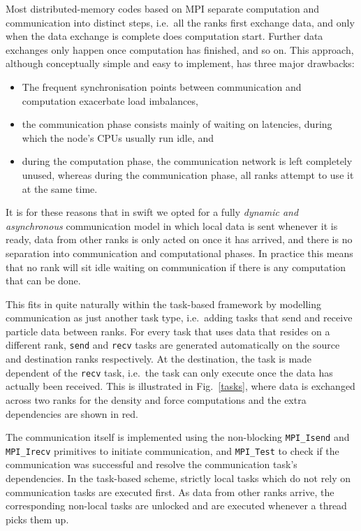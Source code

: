 \documentclass{sig-alternate-05-2015}
\newcommand{\swift}{{\sc swift}\xspace}
\begin{document}
Most distributed-memory codes based on MPI \cite{ref:Snir1998}
separate computation and communication into distinct steps, i.e.~all
the ranks first exchange data, and only when the data exchange is
complete does computation start. Further data exchanges only happen
once computation has finished, and so on.
This approach, although conceptually simple and easy to implement,
has three major drawbacks:
\begin{itemize}
  \item The frequent synchronisation points between communication
    and computation exacerbate load imbalances,
  \item the communication phase consists mainly of waiting on
    latencies, during which the node's CPUs usually run idle, and
  \item during the computation phase, the communication network
    is left completely unused, whereas during the communication
    phase, all ranks attempt to use it at the same time.
\end{itemize}

It is for these reasons that in \swift we opted for a fully
{\em dynamic and asynchronous} communication model in which local
data is sent whenever it is ready, data from other ranks is
only acted on once it has arrived, and there is no separation into
communication and computational phases.
In practice this means that no rank will sit idle waiting on
communication if there is any computation that can be done.

This fits in quite naturally within the task-based framework
by modelling communication as just another task type, i.e.~adding
tasks that send and receive particle data between ranks.
For every task that uses data that resides on a different rank,
{\tt send} and {\tt recv} tasks are generated automatically on the source
and destination ranks respectively.
At the destination, the task is made dependent of the {\tt recv}
task, i.e.~the task can only execute once the data has actually
been received.
This is illustrated in Fig.~\ref{tasks}, where data is exchanged across
two ranks for the density and force computations and the extra
dependencies are shown in red.

The communication itself is implemented using the non-blocking
{\tt MPI\_Isend} and {\tt MPI\_Irecv} primitives to initiate
communication, and {\tt MPI\_Test} to check if the communication was
successful and resolve the communication task's dependencies.  In the
task-based scheme, strictly local tasks which do not rely on
communication tasks are executed first.  As data from other ranks
arrive, the corresponding non-local tasks are unlocked and are
executed whenever a thread picks them up.
\end{document}
